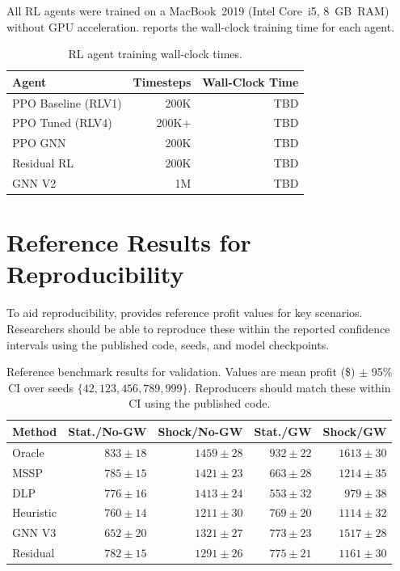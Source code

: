 \documentclass[preprint,12pt]{elsarticle}
\begin{document}
All RL agents were trained on a MacBook~2019 (Intel Core~i5, 8~GB~RAM)
without GPU acceleration.  reports the
wall-clock training time for each agent.

\begin{table}[htbp]
\centering
\caption{RL agent training wall-clock times.}
\label{tab:training_time}
\begin{tabular}{lrr}
\toprule
\textbf{Agent} & \textbf{Timesteps} & \textbf{Wall-Clock Time} \\
\midrule
PPO Baseline (RLV1) & 200K  & TBD \\
PPO Tuned (RLV4)    & 200K+ & TBD \\
PPO GNN             & 200K  & TBD \\
Residual RL         & 200K  & TBD \\
GNN V2              & 1M    & TBD \\
\bottomrule
\end{tabular}
\end{table}


\section{Reference Results for Reproducibility}\label{app:reference}

To aid reproducibility,  provides reference
profit values for key scenarios. Researchers should be able to reproduce
these within the reported confidence intervals using the published code,
seeds, and model checkpoints.

\begin{table}[htbp]
\centering
\caption{Reference benchmark results for validation. Values are mean
         profit (\$) $\pm$ 95\% CI over seeds $\{42, 123, 456, 789, 999\}$.
         Reproducers should match these within CI using the published code.}
\label{tab:reference}
\small
\begin{tabular}{l rrrr}
\toprule
\textbf{Method} & \textbf{Stat./No-GW} & \textbf{Shock/No-GW}
                & \textbf{Stat./GW} & \textbf{Shock/GW} \\
\midrule
Oracle      & $833 \pm 18$  & $1459 \pm 28$  & $932 \pm 22$  & $1613 \pm 30$ \\
MSSP        & $785 \pm 15$  & $1421 \pm 23$  & $663 \pm 28$  & $1214 \pm 35$ \\
DLP         & $776 \pm 16$  & $1413 \pm 24$  & $553 \pm 32$  & $979 \pm 38$ \\
Heuristic   & $760 \pm 14$  & $1211 \pm 30$  & $769 \pm 20$  & $1114 \pm 32$ \\
GNN V3      & $652 \pm 20$  & $1321 \pm 27$  & $773 \pm 23$  & $1517 \pm 28$ \\
Residual    & $782 \pm 15$  & $1291 \pm 26$  & $775 \pm 21$  & $1161 \pm 30$ \\
\bottomrule
\end{tabular}
\end{table}
\end{document}
